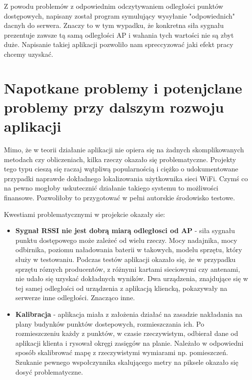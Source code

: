 \documentclass{article}
\begin{document}
Z powodu problemów z odpowiednim odczytywaniem odległości punktów dostępowych, napisany został program symulujący wysyłanie "odpowiednich" dacnyh do serwera. Znaczy to w tym wypadku, że konkretna siła sygnału prezentuje zawsze tą samą odległości AP i wahania tych wartości nie są zbyt duże. Napisanie takiej aplikacji pozwoliło nam spreccyzować jaki efekt pracy chcemy uzyskać.


\section{Napotkane problemy i potenjclane problemy przy dalszym rozwoju aplikacji}

Mimo, że w teorii działanie aplikacji nie opiera się na żadnych skomplikowanych metodach czy obliczeniach, kilka rzeczy okazało się problematyczne. Projekty tego typu cieszą się raczaj wątpliwą popularnością i ciężko o udokumentowane przypadki naprawde dokładnego lokalizowania użytkownika sieci WiFi. Czymś co na pewno mogłoby uskutecznić działanie takiego systemu to możliwości finansowe. Pozwoliłoby to przygotować w pełni autorskie środowisko testowe.

Kwestiami problematycznymi w projekcie okazały sie:

\begin{itemize}
	\item \textbf{Sygnał RSSI nie jest dobrą miarą odległosci od AP} - siła sygnału punktu dostępowego może zależeć od wielu rzeczy. Mocy nadajnika, mocy odbirnika, poziomu naładowania baterii w takowych, modelu sprzętu, który służy w testowaniu. Podczas testów aplikacji okazało się, że w przypadku sprzętu róznych producentów, z różnymi kartami sieciowymi czy antenami, nie udało się uzyskać dokładnych wyników. Dwa urządzenia, znajdujące się w tej samej odległości od urządzenia z aplikacją kliencką, pokazywały na serwerze inne odległości. Znacząco inne.
	
	\item \textbf{Kalibracja} - aplikacja miała z założenia działać na zasadzie nakładania na plany budynków punktów dostepowych, rozmieszczania ich. Po rozmieszczeniu każdy z punktów, w czasie rzeczywistym, odbierał dane od aplikacji klienta i rysował okręgi zasięgów na planie. Należało w odpowiedni sposób skalibrować mapę z rzeczywistymi wymiarami np. pomieszczeń. Szukanie pewnego wspołczynnika skalującego metry na piksele okazało się dosyć problematyczne.
	
	
\end{itemize}
\end{document}
